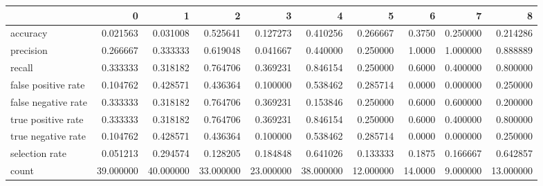\begin{tabular}{lrrrrrrrrr}
\toprule
{} &          0 &          1 &          2 &          3 &          4 &          5 &        6 &         7 &          8 \\
\midrule
accuracy            &   0.021563 &   0.031008 &   0.525641 &   0.127273 &   0.410256 &   0.266667 &   0.3750 &  0.250000 &   0.214286 \\
precision           &   0.266667 &   0.333333 &   0.619048 &   0.041667 &   0.440000 &   0.250000 &   1.0000 &  1.000000 &   0.888889 \\
recall              &   0.333333 &   0.318182 &   0.764706 &   0.369231 &   0.846154 &   0.250000 &   0.6000 &  0.400000 &   0.800000 \\
false positive rate &   0.104762 &   0.428571 &   0.436364 &   0.100000 &   0.538462 &   0.285714 &   0.0000 &  0.000000 &   0.250000 \\
false negative rate &   0.333333 &   0.318182 &   0.764706 &   0.369231 &   0.153846 &   0.250000 &   0.6000 &  0.600000 &   0.200000 \\
true positive rate  &   0.333333 &   0.318182 &   0.764706 &   0.369231 &   0.846154 &   0.250000 &   0.6000 &  0.400000 &   0.800000 \\
true negative rate  &   0.104762 &   0.428571 &   0.436364 &   0.100000 &   0.538462 &   0.285714 &   0.0000 &  0.000000 &   0.250000 \\
selection rate      &   0.051213 &   0.294574 &   0.128205 &   0.184848 &   0.641026 &   0.133333 &   0.1875 &  0.166667 &   0.642857 \\
count               &  39.000000 &  40.000000 &  33.000000 &  23.000000 &  38.000000 &  12.000000 &  14.0000 &  9.000000 &  13.000000 \\
\bottomrule
\end{tabular}
